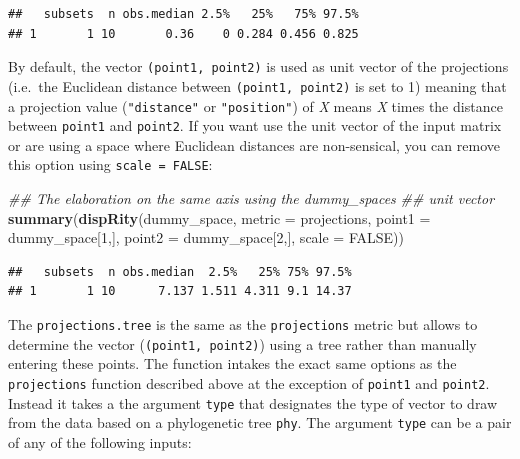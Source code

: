 \documentclass[
]{book}
\newenvironment{Shaded}{\begin{snugshade}}{\end{snugshade}}
\newcommand{\CommentTok}[1]{\textcolor[rgb]{0.56,0.35,0.01}{\textit{#1}}}
\newcommand{\DataTypeTok}[1]{\textcolor[rgb]{0.13,0.29,0.53}{#1}}
\newcommand{\DecValTok}[1]{\textcolor[rgb]{0.00,0.00,0.81}{#1}}
\newcommand{\KeywordTok}[1]{\textcolor[rgb]{0.13,0.29,0.53}{\textbf{#1}}}
\newcommand{\NormalTok}[1]{#1}
\newcommand{\OtherTok}[1]{\textcolor[rgb]{0.56,0.35,0.01}{#1}}
\begin{document}
\begin{verbatim}
##   subsets  n obs.median 2.5%   25%   75% 97.5%
## 1       1 10       0.36    0 0.284 0.456 0.825
\end{verbatim}

By default, the vector \texttt{(point1,\ point2)} is used as unit vector of the projections (i.e.~the Euclidean distance between \texttt{(point1,\ point2)} is set to 1) meaning that a projection value (\texttt{"distance"} or \texttt{"position"}) of \emph{X} means \emph{X} times the distance between \texttt{point1} and \texttt{point2}.
If you want use the unit vector of the input matrix or are using a space where Euclidean distances are non-sensical, you can remove this option using \texttt{scale\ =\ FALSE}:

\begin{Shaded}
\begin{Highlighting}[]
\CommentTok{\#\# The elaboration on the same axis using the dummy\_space\textquotesingle{}s}
\CommentTok{\#\# unit vector}
\KeywordTok{summary}\NormalTok{(}\KeywordTok{dispRity}\NormalTok{(dummy\_space, }\DataTypeTok{metric =}\NormalTok{ projections,}
                              \DataTypeTok{point1 =}\NormalTok{ dummy\_space[}\DecValTok{1}\NormalTok{,],}
                              \DataTypeTok{point2 =}\NormalTok{ dummy\_space[}\DecValTok{2}\NormalTok{,],}
                              \DataTypeTok{scale =} \OtherTok{FALSE}\NormalTok{))}
\end{Highlighting}
\end{Shaded}

\begin{verbatim}
##   subsets  n obs.median  2.5%   25% 75% 97.5%
## 1       1 10      7.137 1.511 4.311 9.1 14.37
\end{verbatim}

The \texttt{projections.tree} is the same as the \texttt{projections} metric but allows to determine the vector (\texttt{(point1,\ point2)}) using a tree rather than manually entering these points.
The function intakes the exact same options as the \texttt{projections} function described above at the exception of \texttt{point1} and \texttt{point2}.
Instead it takes a the argument \texttt{type} that designates the type of vector to draw from the data based on a phylogenetic tree \texttt{phy}.
The argument \texttt{type} can be a pair of any of the following inputs:
\end{document}
